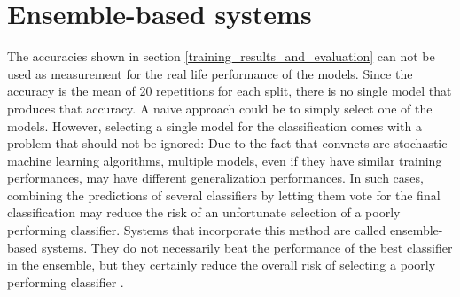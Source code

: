 \section{Ensemble-based systems}
\label{voting}
The accuracies shown in section \ref{training_results_and_evaluation}  can not be used as measurement for the real life performance of the models. Since the accuracy is the mean of 20 repetitions for each split, there is no single model that produces that accuracy. A naive approach could be to simply select one of the models. However, selecting a single model for the classification comes with a problem that should not be ignored: Due to the fact that convnets are stochastic machine learning algorithms, multiple models, even if they have similar training performances, may have different generalization performances. In such cases, combining the predictions of several classifiers by letting them vote for the final classification may reduce the risk of an unfortunate selection of a poorly performing classifier. Systems that incorporate this method are called ensemble-based systems. They do not necessarily beat the performance of the best classifier in the ensemble, but they certainly reduce the overall risk of selecting a poorly performing classifier \cite[p.~22]{ebs}. 

